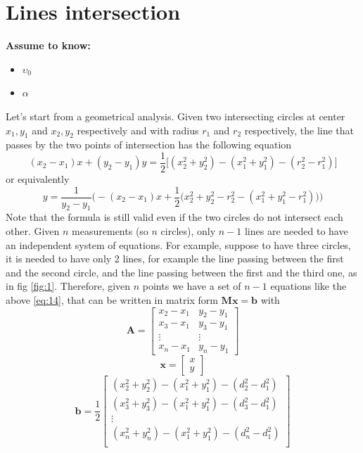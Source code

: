 \documentclass[12pt,twoside]{report}
\begin{document}
\section{Lines intersection}
  \begin{center}
  \textbf{Assume to know:}
  \begin{itemize}
    \centering
    \item $\upsilon_0$
    \item $\alpha$
  \end{itemize}
  \end{center}
Let's start from a geometrical analysis. Given two intersecting circles at center $x_{1},y_{1}$ and $x_{2},y_{2}$ respectively and with radius $r_1$ and $r_2$ respectively, the line that passes by the two points of intersection has the following equation \cite{rzk}
\begin{equation}
    (x_2-x_1)x+(y_2-y_1)y=\frac{1}{2}\big[(x_2^2+y_2^2)-(x_1^2+y_1^2)-(r_2^2-r_1^2)\big]
\end{equation}
or equivalently
\begin{equation}
    y=\frac{1}{y_2-y_1}\bigg(-(x_2-x_1)x+\frac{1}{2}\big(x_2^2+y_2^2-r_2^2-(x_1^2+y_1^2-r_1^2)\big)\bigg)
\end{equation}
Note that the formula is still valid even if the two circles do not intersect each other.
Given $n$ measurements (so $n$ circles), only $n-1$ lines are needed to have an independent system of equations. For example, suppose to have three circles, it is needed to have only 2 lines, for example the line passing between the first and the second circle, and the line passing between the first and the third one, as in fig \ref{fig:1}.
Therefore, given $n$ points we have a set of $n-1$ equations like the above \ref{eq:14}, that can be written in matrix form $\mathbf{Mx}=\mathbf{b}$ with
$$\mathbf{A}=\begin{bmatrix}
x_2-x_1&y_2-y_1\\
x_3-x_1&y_3-y_1\\
\vdots&\vdots\\
x_n-x_1&y_n-y_1
\end{bmatrix}$$
$$\mathbf{x}=\begin{bmatrix}
x\\
y
\end{bmatrix}$$
$$\mathbf{b}=\frac{1}{2}\begin{bmatrix}
(x^2_2+y^2_2)-(x_1^2+y^2_1)-(d_2^2-d_1^2)\\
(x^2_3+y^2_3)-(x_1^2+y^2_1)-(d_3^2-d_1^2)\\
\vdots\\
(x^2_n+y^2_n)-(x_1^2+y^2_1)-(d_n^2-d_1^2)\\
\end{bmatrix}$$
\end{document}
